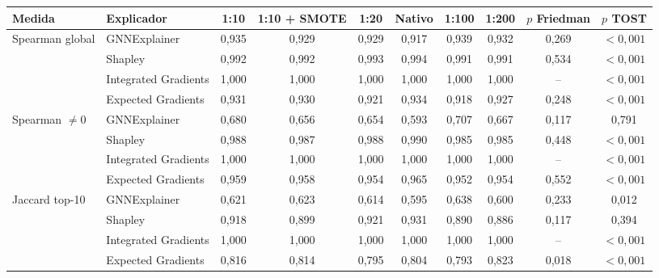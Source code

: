 \begin{tabular}{llcccccccc}
\toprule
Medida & Explicador & 1:10 & 1:10 + SMOTE & 1:20 & Nativo & 1:100 & 1:200 & $p$ Friedman & $p$ TOST \\
\midrule
Spearman global & GNNExplainer & 0{,}935 & 0{,}929 & 0{,}929 & 0{,}917 & 0{,}939 & 0{,}932 & 0{,}269 & $<0{,}001$ \\
 & Shapley & 0{,}992 & 0{,}992 & 0{,}993 & 0{,}994 & 0{,}991 & 0{,}991 & 0{,}534 & $<0{,}001$ \\
 & Integrated Gradients & 1{,}000 & 1{,}000 & 1{,}000 & 1{,}000 & 1{,}000 & 1{,}000 & -- & $<0{,}001$ \\
 & Expected Gradients & 0{,}931 & 0{,}930 & 0{,}921 & 0{,}934 & 0{,}918 & 0{,}927 & 0{,}248 & $<0{,}001$ \\
\midrule
Spearman $\neq 0$ & GNNExplainer & 0{,}680 & 0{,}656 & 0{,}654 & 0{,}593 & 0{,}707 & 0{,}667 & 0{,}117 & 0{,}791 \\
 & Shapley & 0{,}988 & 0{,}987 & 0{,}988 & 0{,}990 & 0{,}985 & 0{,}985 & 0{,}448 & $<0{,}001$ \\
 & Integrated Gradients & 1{,}000 & 1{,}000 & 1{,}000 & 1{,}000 & 1{,}000 & 1{,}000 & -- & $<0{,}001$ \\
 & Expected Gradients & 0{,}959 & 0{,}958 & 0{,}954 & 0{,}965 & 0{,}952 & 0{,}954 & 0{,}552 & $<0{,}001$ \\
\midrule
Jaccard top-10 & GNNExplainer & 0{,}621 & 0{,}623 & 0{,}614 & 0{,}595 & 0{,}638 & 0{,}600 & 0{,}233 & 0{,}012 \\
 & Shapley & 0{,}918 & 0{,}899 & 0{,}921 & 0{,}931 & 0{,}890 & 0{,}886 & 0{,}117 & 0{,}394 \\
 & Integrated Gradients & 1{,}000 & 1{,}000 & 1{,}000 & 1{,}000 & 1{,}000 & 1{,}000 & -- & $<0{,}001$ \\
 & Expected Gradients & 0{,}816 & 0{,}814 & 0{,}795 & 0{,}804 & 0{,}793 & 0{,}823 & 0{,}018 & $<0{,}001$ \\
\bottomrule
\end{tabular}
